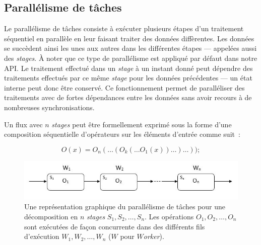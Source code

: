 


\subsection{Parall\'elisme de t\^aches}

Le parall\'elisme de t\^aches consiste \`a ex\'ecuter plusieurs \'etapes d'un traitement s\'equentiel en parall\`ele en leur faisant traiter des données diff\`erentes. Les donn\'ees se succ\`edent ainsi les unes aux autres dans les diff\'erentes \'etapes --- appel\'ees  aussi des \emph{stages}. \`A noter que ce type de parall\'elisme est appliqu\'e par d\'efaut dans notre API. Le traitement effectu\'e dans un \emph{stage} \`a un instant donn\'e peut d\'ependre des traitements effectu\'es par ce m\^eme \emph{stage} pour les donn\'ees pr\'ec\'edentes --- un \'etat interne peut donc \^etre conserv\'e. Ce fonctionnement permet de parall\'eliser des traitements avec de fortes d\'ependances entre les donn\'ees sans avoir recours \`a de nombreuses synchronisations. 

Un flux avec $n$ \emph{stages} peut \^etre formellement exprim\'e sous la forme d'une composition s\'equentielle d'op\'erateurs sur les \'el\'ements d'entr\'ee comme suit~: 

\[
	O(x) = O_n( \ldots (O_k( \ldots O_1(x)) \ldots ) \ldots ));
\]


\begin{figure}[ht]
\centering
     \includegraphics[width=1.0\textwidth]{Figures/ParallelismeDuFlux.jpg}
      \caption[Une repr\'esentation graphique du parall\'elisme de t\^aches.]{Une repr\'esentation graphique du parall\'elisme de t\^aches pour une d\'ecomposition en $n$ \emph{stages} $S_1, S_2, \ldots, S_n$. Les op\'erations $O_1, O_2, \ldots, O_n$ sont ex\'ecut\'ees de fa\c{c}on concurrente dans des diff\'erents fils d'ex\'ecution $W_1, W_2, \ldots, W_n$ ($W$ pour \emph{$W$orker}).}
       \label{ParallelismeDuFlux.fig}
\end{figure}


